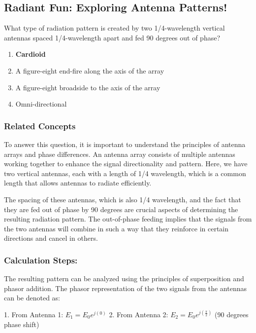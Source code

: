 \subsection{Radiant Fun: Exploring Antenna Patterns!}

\begin{tcolorbox}[colback=gray!10, colframe=black, title=E9C02] What type of radiation pattern is created by two 1/4-wavelength vertical antennas spaced 1/4-wavelength apart and fed 90 degrees out of phase?

\begin{enumerate}[label=\Alph*.]
    \item \textbf{Cardioid}
    \item A figure-eight end-fire along the axis of the array
    \item A figure-eight broadside to the axis of the array
    \item Omni-directional
\end{enumerate} \end{tcolorbox}

\subsubsection{Related Concepts}

To answer this question, it is important to understand the principles of antenna arrays and phase differences. An antenna array consists of multiple antennas working together to enhance the signal directionality and pattern. Here, we have two vertical antennas, each with a length of 1/4 wavelength, which is a common length that allows antennas to radiate efficiently.

The spacing of these antennas, which is also 1/4 wavelength, and the fact that they are fed out of phase by 90 degrees are crucial aspects of determining the resulting radiation pattern. The out-of-phase feeding implies that the signals from the two antennas will combine in such a way that they reinforce in certain directions and cancel in others.

\subsubsection*{Calculation Steps:}

The resulting pattern can be analyzed using the principles of superposition and phasor addition. The phasor representation of the two signals from the antennas can be denoted as:

1. From Antenna 1: \( E_1 = E_0 e^{j(0)} \)
2. From Antenna 2: \( E_2 = E_0 e^{j(\frac{\pi}{2})} \)  (90 degrees phase shift)

